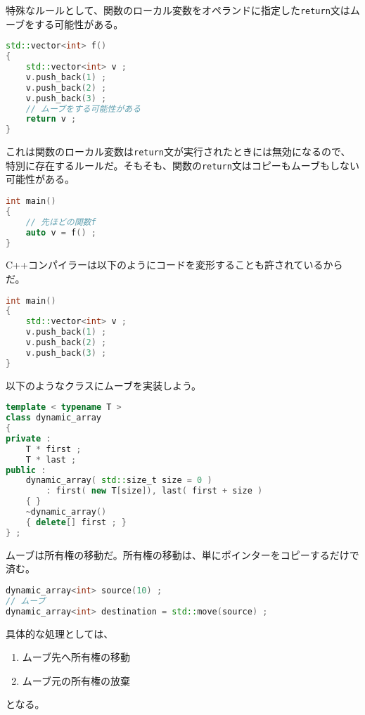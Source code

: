 特殊なルールとして、関数のローカル変数をオペランドに指定した\texttt{return}文はムーブをする可能性がある。

\begin{lstlisting}[language={C++}]
std::vector<int> f()
{
    std::vector<int> v ;
    v.push_back(1) ;
    v.push_back(2) ;
    v.push_back(3) ;
    // ムーブをする可能性がある
    return v ;
}
\end{lstlisting}

これは関数のローカル変数は\texttt{return}文が実行されたときには無効になるので、特別に存在するルールだ。そもそも、関数の\texttt{return}文はコピーもムーブもしない可能性がある。

\begin{lstlisting}[language={C++}]
int main()
{
    // 先ほどの関数f
    auto v = f() ;
}
\end{lstlisting}

C++コンパイラーは以下のようにコードを変形することも許されているからだ。

\begin{lstlisting}[language={C++}]
int main()
{
    std::vector<int> v ;
    v.push_back(1) ;
    v.push_back(2) ;
    v.push_back(3) ;
}
\end{lstlisting}


以下のようなクラスにムーブを実装しよう。

\begin{lstlisting}[language={C++}]
template < typename T >
class dynamic_array
{
private :
    T * first ;
    T * last ;
public :
    dynamic_array( std::size_t size = 0 )
        : first( new T[size]), last( first + size )
    { }
    ~dynamic_array()
    { delete[] first ; }
} ;
\end{lstlisting}

ムーブは所有権の移動だ。所有権の移動は、単にポインターをコピーするだけで済む。

\ifTombow\pagebreak\fi
\begin{lstlisting}[language={C++}]
dynamic_array<int> source(10) ;
// ムーブ
dynamic_array<int> destination = std::move(source) ;
\end{lstlisting}

具体的な処理としては、
\begin{enumerate}
\def\labelenumi{\arabic{enumi}.}
\item
  ムーブ先へ所有権の移動
\item
  ムーブ元の所有権の放棄
\end{enumerate}
となる。

